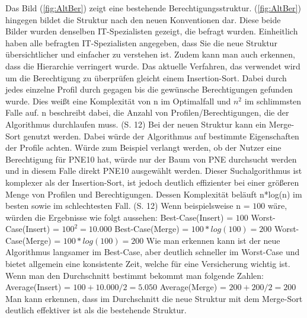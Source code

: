 \newpage
Das Bild (\ref{fig:AltBer}) zeigt eine bestehende Berechtigungsstruktur.
(\ref{fig:AltBer}) hingegen bildet die Struktur nach den neuen Konventionen dar.
Diese beide Bilder wurden denselben IT-Spezialisten gezeigt, die befragt wurden.
Einheitlich haben alle befragten IT-Spezialisten angegeben, dass Sie die neue Struktur übersichtlicher und einfacher zu verstehen ist.
Zudem kann man auch erkennen, dass die Hierarchie verringert wurde.
\newline
Das aktuelle Verfahren, das verwendet wird um die Berechtigung zu überprüfen gleicht einem Insertion-Sort.
Dabei durch jedes einzelne Profil durch gegagen bis die gewünsche Berechtigungen gefunden wurde.
Dies weißt eine Komplexität von n im Optimalfall und $n^2$ im schlimmsten Falle auf.
n beschreibt dabei, die Anzahl von Profilen/Berechtigungen, die der Algorithmus durchlaufen muss. \cite{weblogIn,log} (S. 12)
\newline
Bei der neuen Struktur kann ein Merge-Sort genutzt werden.
Dabei würde der Algorithmus auf bestimmte Eigenschaften der Profile achten.
Würde zum Beispiel verlangt werden, ob der Nutzer eine Berechtigung für PNE10 hat, würde nur der Baum von PNE durchsucht werden und in diesem Falle direkt PNE10 ausgewählt werden.
Dieser Suchalgorithmus ist komplexer als der Insertion-Sort, ist jedoch deutlich effizienter bei einer größeren Menge von Profilen und Berechtigungen.
Dessen Komplexität beläuft n*log(n) im besten sowie im schlechtesten Fall. \cite{weblogMer,log} (S. 12)
\newline
Wenn beispielsweise n = $100$ wäre, würden die Ergebnisse wie folgt aussehen:
\newline
\newline
Best-Case(Insert) = $100$
\newline
Worst-Case(Insert) = $100^2 = 10.000$
\newline
\newline
Best-Case(Merge) = $100*log(100) = 200$
\newline
Worst-Case(Merge) = $100*log(100) = 200$
\newline
\newline
Wie man erkennen kann ist der neue Algorithmus langsamer im Best-Case, aber deutlich schneller im Worst-Case und bietet allgemein eine konsistente Zeit, welche für eine Versicherung wichtig ist.
Wenn man den Durchschnitt bestimmt bekommt man folgende Zahlen:
\newline
\newline
Average(Insert) = $100 + 10.000 / 2 = 5.050$
\newline
\newline
Average(Merge) = $200 + 200 / 2 = 200$
\newline
\newline
Man kann erkennen, dass im Durchschnitt die neue Struktur mit dem Merge-Sort deutlich effektiver ist als die bestehende Struktur.

